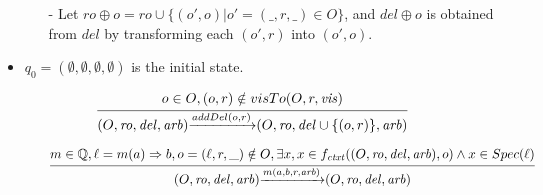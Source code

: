 \begin{itemize}
\begin {itemize}
    \item[-] Let $ro \oplus o = ro \cup \{ (o',o) \vert o' = (\_,r,\_) \in O \}$, and $del \oplus o$ is obtained from $del$ by transforming each $(o',r)$ into $(o',o)$.

    \end{itemize}

\item[-] $q_0=(\emptyset,\emptyset,\emptyset,\emptyset)$ is the initial state.
\end{itemize}

\begin{figure}[ht]

\[
\begin{array}{l c}
\bigfrac{ o \in O, (o,r)\notin visTo(O,r,\mathit{vis}) }
{ (O,\mathit{ro},\mathit{del},\mathit{arb}) {\xrightarrow{addDel(o,r)}} (O,\mathit{ro},\mathit{del} \cup \{ (o,r) \},\mathit{arb}) } %
\end{array}
\]



\[
\begin{array}{l c}
\bigfrac{ m \in \mathbb{Q}, \ell = m(a) \Rightarrow b, o=(\ell,r,\_) \notin O, \exists x, x \in f_{\mathit{ctxt}}((O,\mathit{ro},\mathit{del},\mathit{arb}),o) \wedge x \in Spec(\ell) }
{ (O,\mathit{ro},\mathit{del},\mathit{arb}) {\xrightarrow{m(a,b,r,\mathit{arb})}} (O,\mathit{ro},\mathit{del},\mathit{arb}) } %
\end{array}
\]




\end{figure}
